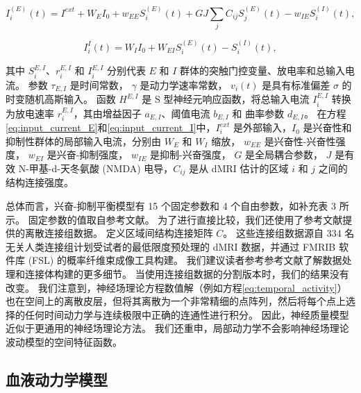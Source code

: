 \documentclass[lang=cn,a4paper,newtx]{elegantpaper}
\begin{document}
\begin{equation}\label{eq:input_current_E}
	I_i^{(E)}(t) = I^{ext} + W_E I_0 + w_{EE} S_i^{(E)} (t) + G J \sum_j C_{ij} S_j^{(E)}(t) - w_{IE} S_i^{(I)} (t), 
\end{equation}

\begin{equation}\label{eq:input_current_I}
	I_i^{I} (t) = W_I I_0 +
				  W_{EI} S_i^{(E)} (t) - 
				  S_i^{(I)} (t),
\end{equation}

其中 $ S_i^{E,I} $、$ r_i^{E, I} $ 和 $ I_i^{E, I} $ 分别代表 $ E $ 和 $ I $ 群体的突触门控变量、放电率和总输入电流。
参数 $ \tau_{E,I} $ 是时间常数，
$ \gamma $ 是动力学速率常数，
$ v_i (t) $ 是具有标准偏差 $ \sigma $ 的时变随机高斯输入。
函数 $ H^{E,I} $ 是 S 型神经元响应函数，将总输入电流 $ I_i^{E,I} $ 转换为放电速率 $ r_i^{E,I} $，其由增益因子 $ a_{E,I} $、阈值电流 $ b_{E,I} $ 和 曲率参数 $ d_{E,I} $。
在方程\ref{eq:input_current_E}和\ref{eq:input_current_I}中，$ I_i^{ext} $ 是外部输入，$ I_0 $ 是兴奋性和抑制性群体的局部输入电流，分别由 $ W_E $ 和 $ W_I $ 缩放，
$ w_{EE} $ 是兴奋性-兴奋性强度，
$ w_{EI} $ 是兴奋-抑制强度，
$ w_{IE} $ 是抑制-兴奋强度，
$ G $ 是全局耦合参数，
$ J $ 是有效 N-甲基-d-天冬氨酸 (NMDA) 电导，$ C_{ij} $ 是从 dMRI 估计的区域 $ i $ 和 $ j $ 之间的结构连接强度。


总体而言，兴奋-抑制平衡模型有 15 个固定参数和 4 个自由参数，如补充表 3 所示。
固定参数的值取自参考文献\cite{demirtacs2019hierarchical}。
为了进行直接比较，我们还使用了参考文献\cite{demirtacs2019hierarchical}提供的离散连接组数据。
定义区域间结构连接矩阵 $ C $。
这些连接组数据源自 334 名无关人类连接组计划受试者的最低限度预处理的 dMRI 数据，并通过 FMRIB 软件库 (FSL)\cite{behrens2003characterization} 的概率纤维束成像工具构建。 
我们建议读者参考参考文献\cite{demirtacs2019hierarchical}了解数据处理和连接体构建的更多细节。
当使用连接组数据的分割版本时，我们的结果没有改变。
我们注意到，神经场理论方程数值解（例如方程\ref{eq:temporal_activity}）也在空间上的离散皮层，但将其离散为一个非常精细的点阵列，然后将每个点上选择的任何时间动力学与连续极限中正确的连通性进行积分。
因此，神经质量模型近似于更通用的神经场理论方法\cite{deco2008dynamic,spiegler2013systematic}。 
我们还重申，局部动力学不会影响神经场理论波动模型的空间特征函数。



\subsection{血液动力学模型} \label{sec:haemodynamic_model}
\end{document}
